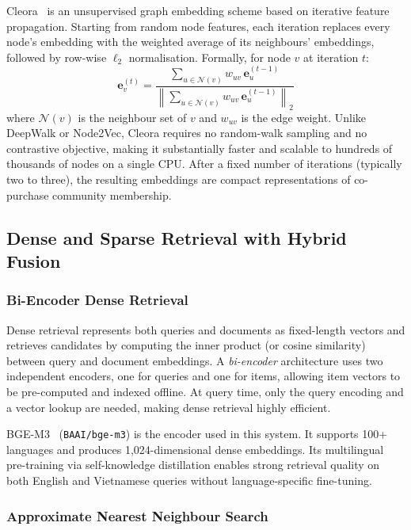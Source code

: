 Cleora~\cite{rychalska2021cleora} is an unsupervised graph embedding scheme based on iterative feature propagation.
Starting from random node features, each iteration replaces every node's embedding with the weighted average of its neighbours' embeddings, followed by row-wise $\ell_2$ normalisation.
Formally, for node $v$ at iteration $t$:
\begin{equation}
  \mathbf{e}_v^{(t)} = \frac{\sum_{u \in \mathcal{N}(v)} w_{uv}\, \mathbf{e}_u^{(t-1)}}{\left\| \sum_{u \in \mathcal{N}(v)} w_{uv}\, \mathbf{e}_u^{(t-1)} \right\|_2}
\end{equation}
where $\mathcal{N}(v)$ is the neighbour set of $v$ and $w_{uv}$ is the edge weight.
Unlike DeepWalk or Node2Vec, Cleora requires no random-walk sampling and no contrastive objective, making it substantially faster and scalable to hundreds of thousands of nodes on a single CPU.
After a fixed number of iterations (typically two to three), the resulting embeddings are compact representations of co-purchase community membership.

\subsection{Dense and Sparse Retrieval with Hybrid Fusion}
\label{sec:retrieval}

\subsubsection{Bi-Encoder Dense Retrieval}

Dense retrieval represents both queries and documents as fixed-length vectors and retrieves candidates by computing the inner product (or cosine similarity) between query and document embeddings.
A \textit{bi-encoder} architecture uses two independent encoders, one for queries and one for items, allowing item vectors to be pre-computed and indexed offline.
At query time, only the query encoding and a vector lookup are needed, making dense retrieval highly efficient.

BGE-M3~\cite{chen2024bge} (\texttt{BAAI/bge-m3}) is the encoder used in this system.
It supports 100+ languages and produces 1{,}024-dimensional dense embeddings.
Its multilingual pre-training via self-knowledge distillation enables strong retrieval quality on both English and Vietnamese queries without language-specific fine-tuning.

\subsubsection{Approximate Nearest Neighbour Search}

